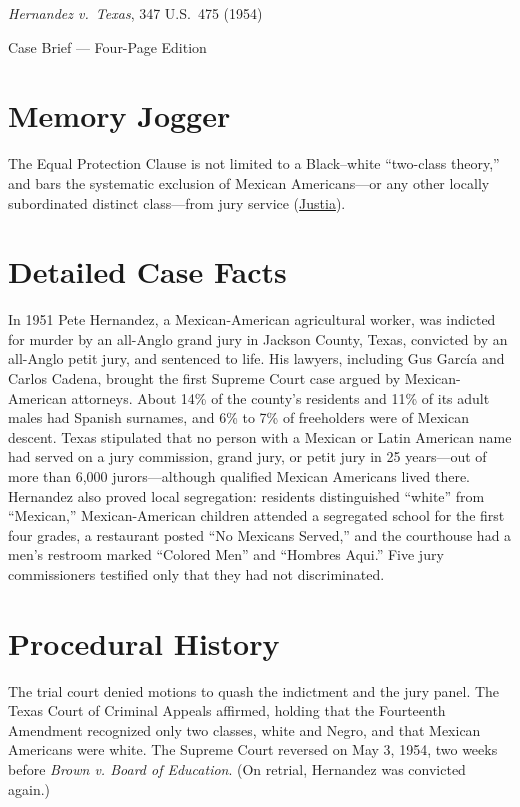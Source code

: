 \documentclass[12pt]{article}
\begin{document}
\begin{center}
{\LARGE \textit{Hernandez v.\ Texas}, 347 U.S.\ 475 (1954)\par}
\vspace{0.8em}
{\large Case Brief --- Four-Page Edition\par}
\end{center}
\vspace{1em}

\section{Memory Jogger}

The Equal Protection Clause is not limited to a Black--white ``two-class theory,'' and bars the systematic exclusion of Mexican Americans---or any other locally subordinated distinct class---from jury service (\href{https://supreme.justia.com/cases/federal/us/347/475/}{Justia}).

\section{Detailed Case Facts}

In 1951 Pete Hernandez, a Mexican-American agricultural worker, was indicted for murder by an all-Anglo grand jury in Jackson County, Texas, convicted by an all-Anglo petit jury, and sentenced to life. His lawyers, including Gus Garc\'{i}a and Carlos Cadena, brought the first Supreme Court case argued by Mexican-American attorneys. About 14\% of the county's residents and 11\% of its adult males had Spanish surnames, and 6\% to 7\% of freeholders were of Mexican descent. Texas stipulated that no person with a Mexican or Latin American name had served on a jury commission, grand jury, or petit jury in 25 years---out of more than 6,000 jurors---although qualified Mexican Americans lived there. Hernandez also proved local segregation: residents distinguished ``white'' from ``Mexican,'' Mexican-American children attended a segregated school for the first four grades, a restaurant posted ``No Mexicans Served,'' and the courthouse had a men's restroom marked ``Colored Men'' and ``Hombres Aqui.'' Five jury commissioners testified only that they had not discriminated.

\section{Procedural History}

The trial court denied motions to quash the indictment and the jury panel. The Texas Court of Criminal Appeals affirmed, holding that the Fourteenth Amendment recognized only two classes, white and Negro, and that Mexican Americans were white. The Supreme Court reversed on May 3, 1954, two weeks before \textit{Brown v. Board of Education}. (On retrial, Hernandez was convicted again.)
\end{document}
